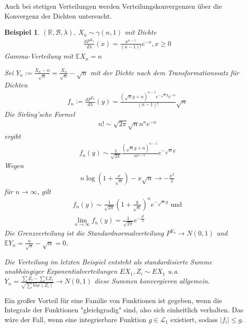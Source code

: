\documentclass[]{article}
\newtheorem*{example}{Beispiel}
\begin{document}
Auch bei stetigen Verteilungen werden Verteilungskonvergenzen über die Konvergenz der Dichten untersucht.

\begin{example}
	$(\mathbb{R}, \mathcal{B}, \lambda)$, $X_n\sim\gamma(n,1)$ mit Dichte
	\begin{align*}
		\frac{dP^{X_n}}{d\lambda}(x) = \frac{x^{n-1}}{(n-1)!} e^{-x}, x\geq 0
	\end{align*}
	Gamma-Verteilung mit $\mathbb{E}X_n = n$
	
	Sei $Y_n := \frac{X_n - n}{\sqrt{n}} = \frac{X_n}{\sqrt{n}} - \sqrt{n}$ mit der Dichte nach dem Transformationssatz für Dichten
	\begin{align*}
		f_n := \frac{dP^{Y_n}}{d\lambda}(y) = \frac{(\sqrt{n}y+n)^{n-1}e^{-\sqrt{n}y}e^{-n}}{(n-1)!}\sqrt{n}
	\end{align*}
	Die Sirling'sche Formel
	\begin{align*}
		n! \sim \sqrt{2\pi} \sqrt{n} n^n e^{-n}
	\end{align*}
	ergibt
	\begin{align*}
		f_n(y) \sim \frac{1}{\sqrt{2\pi}} \frac{(\sqrt{n}y+n)^{n-1}}{n^{n-1}} e^{-\sqrt{n}y}
	\end{align*}
	Wegen
	\begin{align*}
		n\log(1+\frac{x}{\sqrt{n}}) - x\sqrt{n} \rightarrow -\frac{x^2}{2}
	\end{align*}
	für $n\rightarrow\infty$, gilt
	\begin{align*}
		f_n(y) \sim \frac{1}{\sqrt{2\pi}}(1+\frac{y}{\sqrt{n}})^n e^{-\sqrt{n}y} \text{ und}\\
		\lim\limits_{n\rightarrow\infty} f_n(y) = \frac{1}{\sqrt{2\pi}} e^{-\frac{y^2}{2}}
	\end{align*}
	Die Grenzverteilung ist die Standardnormalverteilung $P^{Y_n}\rightarrow N(0,1)$ und $\mathbb{E}Y_n = \frac{n}{\sqrt{n}} - \sqrt{n} = 0$.
	
	Die Verteilung im letzten Beispiel entsteht als standardisierte Summe unabhängiger Exponentialverteilungen $EX_1, Z_i \sim EX_1$ u.a. $Y_n = \frac{\sum Z_i - \sum \mathbb{E}Z_i}{\sqrt{\sum Var(Z_i)}}\rightarrow N(0,1)$ diese Summen konvergieren allgemein.
\end{example}

Ein großer Vorteil für eine Familie von Funktionen ist gegeben, wenn die Integrale der Funktionen "gleichgradig" sind, also sich einheitlich verhalten. Das wäre der Fall, wenn eine integrierbare Funktion $g \in \mathcal{L}_1$ existiert, sodass $|f_i| \leq g$.
\end{document}
